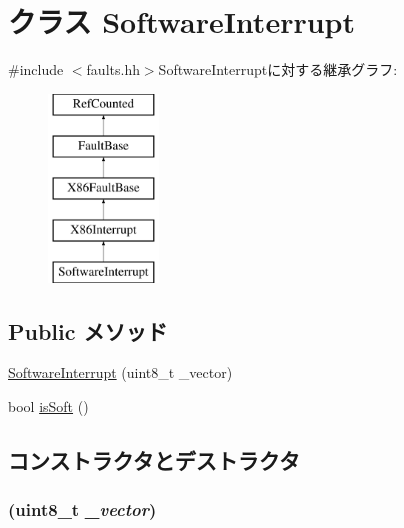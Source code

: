 \hypertarget{classX86ISA_1_1SoftwareInterrupt}{
\section{クラス SoftwareInterrupt}
\label{classX86ISA_1_1SoftwareInterrupt}
}


{\ttfamily \#include $<$faults.hh$>$}SoftwareInterruptに対する継承グラフ:\begin{figure}[H]
\begin{center}
\leavevmode
\includegraphics[height=5cm]{classX86ISA_1_1SoftwareInterrupt}
\end{center}
\end{figure}
\subsection*{Public メソッド}
\begin{DoxyCompactItemize}
\item 
\hyperlink{classX86ISA_1_1SoftwareInterrupt_abd06639777241550edb97f16a657350b}{SoftwareInterrupt} (uint8\_\-t \_\-vector)
\item 
bool \hyperlink{classX86ISA_1_1SoftwareInterrupt_aa6fbefd34fa168be687772f1e4498220}{isSoft} ()
\end{DoxyCompactItemize}


\subsection{コンストラクタとデストラクタ}
\hypertarget{classX86ISA_1_1SoftwareInterrupt_abd06639777241550edb97f16a657350b}{
\subsubsection[{SoftwareInterrupt}]{ (uint8\_\-t {\em \_\-vector})}}
\label{classX86ISA_1_1SoftwareInterrupt_abd06639777241550edb97f16a657350b}



